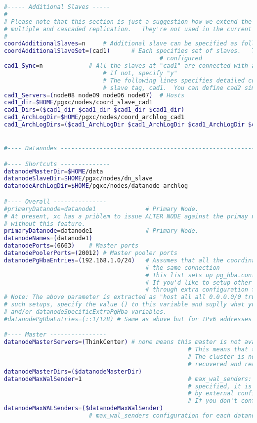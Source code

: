 \begin{lstlisting}[language=bash,caption={Konfigurationsdatei pgxc-ctl}]
#----- Additional Slaves -----
#
# Please note that this section is just a suggestion how we extend the configuration for
# multiple and cascaded replication.   They're not used in the current version.
#
coordAdditionalSlaves=n		# Additional slave can be specified as follows: where you
coordAdditionalSlaveSet=(cad1)		# Each specifies set of slaves.   This case, two set of slaves are
											# configured
cad1_Sync=n		  		# All the slaves at "cad1" are connected with asynchronous mode.
							# If not, specify "y"
							# The following lines specifies detailed configuration for each
							# slave tag, cad1.  You can define cad2 similarly.
cad1_Servers=(node08 node09 node06 node07)	# Hosts
cad1_dir=$HOME/pgxc/nodes/coord_slave_cad1
cad1_Dirs=($cad1_dir $cad1_dir $cad1_dir $cad1_dir)
cad1_ArchLogDir=$HOME/pgxc/nodes/coord_archlog_cad1
cad1_ArchLogDirs=($cad1_ArchLogDir $cad1_ArchLogDir $cad1_ArchLogDir $cad1_ArchLogDir)


#---- Datanodes -------------------------------------------------------------------------------------------------------

#---- Shortcuts --------------
datanodeMasterDir=$HOME/data
datanodeSlaveDir=$HOME/pgxc/nodes/dn_slave
datanodeArchLogDir=$HOME/pgxc/nodes/datanode_archlog

#---- Overall ---------------
#primaryDatanode=datanode1				# Primary Node.
# At present, xc has a priblem to issue ALTER NODE against the primay node.  Until it is fixed, the test will be done
# without this feature.
primaryDatanode=datanode1				# Primary Node.
datanodeNames=(datanode1)
datanodePorts=(6663)	# Master ports
datanodePoolerPorts=(20012)	# Master pooler ports
datanodePgHbaEntries=(192.168.1.0/24)	# Assumes that all the coordinator (master/slave) accepts
										# the same connection
										# This list sets up pg_hba.conf for $pgxcOwner user.
										# If you'd like to setup other entries, supply them
										# through extra configuration files specified below.
# Note: The above parameter is extracted as "host all all 0.0.0.0/0 trust".   If you don't want
# such setups, specify the value () to this variable and suplly what you want using datanodeExtraPgHba
# and/or datanodeSpecificExtraPgHba variables.
#datanodePgHbaEntries=(::1/128)	# Same as above but for IPv6 addresses

#---- Master ----------------
datanodeMasterServers=(ThinkCenter)	# none means this master is not available.
													# This means that there should be the master but is down.
													# The cluster is not operational until the master is
													# recovered and ready to run.	
datanodeMasterDirs=($datanodeMasterDir)
datanodeMaxWalSender=1								# max_wal_senders: needed to configure slave. If zero value is 
													# specified, it is expected this parameter is explicitly supplied
													# by external configuration files.
													# If you don't configure slaves, leave this value zero.
datanodeMaxWALSenders=($datanodeMaxWalSender)
						# max_wal_senders configuration for each datanode


\end{lstlisting}

